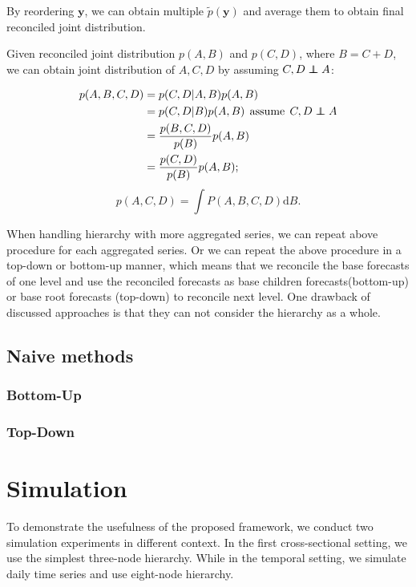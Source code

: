 \documentclass[a4paper,review,12pt,authoryear]{elsarticle}
\newcommand\independent{\protect\mathpalette{\protect\independenT}{\perp}}
\def\independenT#1#2{\mathrel{\rlap{$#1#2$}\mkern2mu{#1#2}}}
\begin{document}
   By reordering $\bm{y}$, we can obtain multiple $\tilde p(\bm{y})$ and average them to obtain final reconciled joint distribution.

  Given reconciled joint distribution $p(A, B)$ and $p(C,D)$, where $B=C+D$, we can obtain joint distribution of $A,C,D$ by assuming $C,D \independent{A}$:

  \[
      \begin{aligned}
        p(A,B,C,D) &= p(C, D|A,B)p(A,B) \\ 
          &= p(C,D|B)p(A,B)  \:\: \textrm{assume}\:\: C,D \independent {A}\\
          &= \frac{p(B,C,D)}{p(B)}p(A,B) \\
          &= \frac{p(C,D)}{p(B)}p(A,B);
     \end{aligned}
     \]
     \[
       p(A,C,D) = \int P(A,B,C,D) \textrm{d}B.
      \]


   When handling hierarchy with more aggregated series, we can repeat above procedure for each aggregated series. 
   Or we can repeat the above procedure in a top-down or bottom-up manner, which means that we reconcile the base forecasts of one level and use the reconciled forecasts as base children forecasts(bottom-up) or base root forecasts (top-down) to reconcile next level. One drawback of discussed approaches is that they can not consider the hierarchy as a whole.

   \subsection{Naive methods}

   \subsubsection*{Bottom-Up}

   \subsubsection*{Top-Down}

\section{Simulation}
\label{sec:simulation}
To demonstrate the usefulness of the proposed framework, we conduct two simulation experiments in different context. 
In the first cross-sectional setting, we use the simplest three-node hierarchy. 
While in the temporal setting, we simulate daily time series and use eight-node hierarchy.
\end{document}
